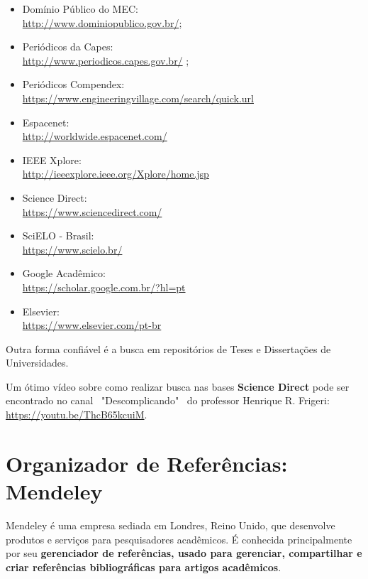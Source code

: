 \begin{itemize}
    \item Domínio Público do MEC:\\
    \url{http://www.dominiopublico.gov.br/};

    \item Periódicos da Capes:\\
    \url{http://www.periodicos.capes.gov.br/} ;

    \item Periódicos Compendex:\\
    \url{https://www.engineeringvillage.com/search/quick.url}

    \item Espacenet: \\ \url{http://worldwide.espacenet.com/}

    \item IEEE Xplore: \\
    \url{http://ieeexplore.ieee.org/Xplore/home.jsp}%

    \item Science Direct: \\
    \url{https://www.sciencedirect.com/}
    
    \item SciELO - Brasil: \\
    \url{https://www.scielo.br/}

    \item Google Acadêmico: \\
    \url{https://scholar.google.com.br/?hl=pt}

    \item Elsevier: \\
    \url{https://www.elsevier.com/pt-br}
\end{itemize}

Outra forma confiável é a busca em  repositórios de Teses e Dissertações de Universidades.

Um ótimo vídeo sobre como realizar busca nas bases {\bf Science Direct} pode ser encontrado no canal ~"Descomplicando"~ do professor Henrique R. Frigeri: \url{https://youtu.be/ThcB65kcuiM}.


\section{Organizador de Referências: Mendeley}

Mendeley é uma empresa sediada em Londres, Reino Unido, que desenvolve produtos e serviços para pesquisadores acadêmicos. É conhecida principalmente por seu {\bf gerenciador de referências, usado para gerenciar, compartilhar e criar referências bibliográficas para artigos acadêmicos}.

